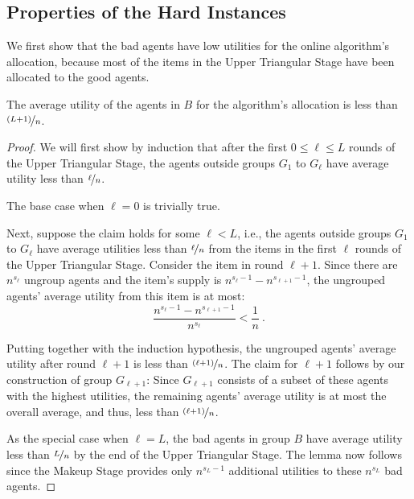 \documentclass[11pt,letterpaper]{article}
\begin{document}
\subsection{Properties of the Hard Instances}

We first show that the bad agents have low utilities for the online algorithm's allocation, because most of the items in the Upper Triangular Stage have been allocated to the good agents.


\begin{lemma}
    \label{lem:hardness-negative}
    The average utility of the agents in $B$ for the algorithm's allocation is less than $\nicefrac{(L+1)}{n}$.
\end{lemma}



\begin{proof}
    We will first show by induction that after the first $0 \le \ell \le L$ rounds of the Upper Triangular Stage, the agents outside groups $G_1$ to $G_{\ell}$ have average utility less than $\nicefrac{\ell}{n}$.

    The base case when $\ell=0$ is trivially true.
    
    Next, suppose the claim holds for some $\ell < L$, i.e., the agents outside groups $G_1$ to $G_\ell$ have average utilities less than $\nicefrac{\ell}{n}$ from the items in the first $\ell$ rounds of the Upper Triangular Stage. 
    Consider the item in round $\ell + 1$.
    Since there are $n^{s_\ell}$ ungroup agents and the item's supply is $n^{s_\ell-1} - n^{s_{\ell+1}-1}$, the ungrouped agents' average utility from this item is at most:
    \[
        \frac{n^{s_\ell-1} - n^{s_{\ell+1}-1}}{n^{s_\ell}} < \frac{1}{n}
        ~.
    \]
    
    Putting together with the induction hypothesis, the ungrouped agents' average utility after round $\ell+1$ is less than $\nicefrac{(\ell+1)}{n}$. 
    The claim for $\ell+1$  follows by our construction of group $G_{\ell+1}$:
    Since $G_{\ell+1}$ consists of a subset of these agents with the highest utilities, the remaining agents' average utility is at most the overall average, and thus, less than $\nicefrac{(\ell+1)}{n}$.
    
    As the special case when $\ell = L$, the bad agents in group $B$ have average utility less than $\nicefrac{L}{n}$ by the end of the Upper Triangular Stage.
    The lemma now follows since the Makeup Stage provides only $n^{s_L-1}$ additional utilities to these $n^{s_L}$ bad agents.
\end{proof}
\end{document}
